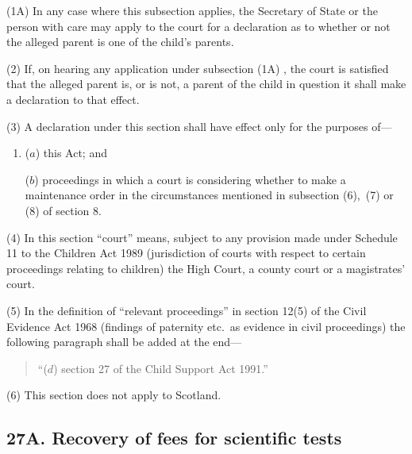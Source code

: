 \documentclass[12pt,a4paper]{article}
\begin{document}
(1A) In any case where this subsection applies, the Secretary of State or the person with care may apply to the court for a declaration as to whether or not the alleged parent is one of the child’s parents.

(2) If, on hearing any application under subsection 
(1A)%
, the court is satisfied that the alleged parent is, or is not, a parent of the child in question it shall make a declaration to that effect.


(3) A declaration under this section shall have effect only for the purposes of—
\begin{enumerate}\item[]
($a$) this Act; and

($b$) proceedings in which a court is considering whether to make a maintenance order in the circumstances mentioned in subsection (6),~(7) or (8) of section 8.
\end{enumerate}

(4) In this section “court” means, subject to any provision made under Schedule 11 to the Children Act 1989 (jurisdiction of courts with respect to certain proceedings relating to children) the High Court, a county court or a magistrates' court.

(5) In the definition of “relevant proceedings” in section 12(5)  of the Civil Evidence Act 1968 (findings of paternity etc.\ as evidence in civil proceedings) the following paragraph shall be added at the end—
\begin{quotation}
“($d$) section 27 of the Child Support Act 1991.”
\end{quotation}

(6) This section does not apply to Scotland.


\subsection{27A. Recovery of fees for scientific tests}
\end{document}
